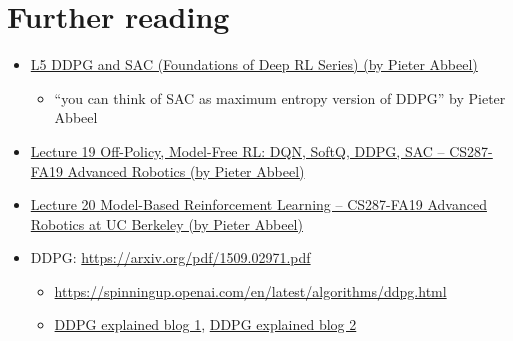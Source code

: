 \documentclass[lang=en,mode=normal,device=normal,color=blue,12pt]{elegantnote}
\DeclareMathOperator*{\1}{\mathbbm{1}}
\begin{document}
\section{Further reading}
%
\begin{itemize}
\item \href{https://www.youtube.com/watch?v=pg-lKy7JIRk}{L5 DDPG and SAC (Foundations of Deep RL Series) (by Pieter Abbeel)}
\begin{itemize}
\item ``you can think of SAC as maximum entropy version of DDPG'' by Pieter Abbeel
\end{itemize}
\item \href{https://www.youtube.com/watch?v=QASqaj_HUZw}{Lecture 19 Off-Policy, Model-Free RL: DQN, SoftQ, DDPG, SAC -- CS287-FA19 Advanced Robotics (by Pieter Abbeel)}
\item \href{https://www.youtube.com/watch?v=Y2XBiUtZo1k}{Lecture 20 Model-Based Reinforcement Learning -- CS287-FA19 Advanced Robotics at UC Berkeley (by Pieter Abbeel)}
\item DDPG: \url{https://arxiv.org/pdf/1509.02971.pdf}
\begin{itemize}
\item \url{https://spinningup.openai.com/en/latest/algorithms/ddpg.html}
\item \href{https://towardsdatascience.com/deep-deterministic-policy-gradient-ddpg-theory-and-implementation-747a3010e82f}{DDPG explained blog 1}, \href{https://lilianweng.github.io/lil-log/2018/04/08/policy-gradient-algorithms.html#ddpg}{DDPG explained blog 2}
\end{itemize}
\end{itemize}


%



\end{document}
